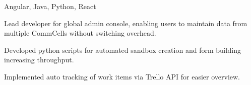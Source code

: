 \documentclass[]{font}
\begin{document}
\begin{minipage}[t]{0.66\textwidth}
Angular, Java, Python, React
\vspace{\topsep}
\begin{tightemize}
\item Lead developer for global admin console, enabling users to maintain data from multiple CommCells without switching overhead. 
\item Developed python scripts for automated sandbox creation and form building increasing throughput. 
\item Implemented auto tracking of work items via Trello API for easier overview.
\end{tightemize}    
\sectionsep



\end{minipage}
\end{document}
